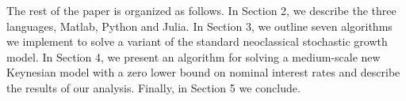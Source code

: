 The rest of the paper is organized as follows. In Section 2, we describe the
three languages, Matlab, Python and Julia. In Section 3, we outline seven
algorithms we implement to solve a variant of the standard neoclassical
stochastic growth model. In Section 4, we present an algorithm for solving a
medium-scale new Keynesian model with a zero lower bound on nominal interest
rates and describe the results of our analysis. Finally, in Section 5 we
conclude.

